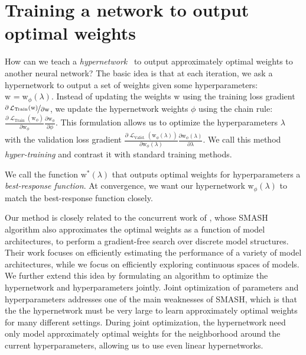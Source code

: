 \documentclass{article} %
\newcommand{\param}{\mathrm{w}} %
\newcommand{\hyper}{\lambda} %
\newcommand{\hyperFixed}{\hyper} %
\newcommand{\innerOptParam}[1]{\param^{*} \! \left( #1 \right)} %
\newcommand{\lossSymbol}{\mathop{\mathcal{L}}} %
\newcommand{\lossSymbolInner}{\lossSymbol_{\mathrm{Train}}} %
\newcommand{\lossSymbolOuter}{\lossSymbol_{\mathrm{Valid.}}} %
\newcommand{\responseParam}{\phi} %
\newcommand{\responseParamFixed}{\responseParam} %
\newcommand{\approxResponseSymbol}[1]{\param_{#1}} %
\newcommand{\approxResponse}[2]{\approxResponseSymbol{#2} ( #1 )} %
\begin{document}
\section{Training a network to output optimal weights}
\label{sec.new_formulation}
How can we teach a \emph{hypernetwork}~\citep{ha2016hypernetworks} to output approximately optimal weights to another neural network?
The basic idea is that at each iteration, we ask a hypernetwork to output a set of weights given some hyperparameters:
$\approxResponseSymbol{} = \approxResponse{\hyperFixed}{\responseParamFixed}$.
Instead of updating the weights $\param$ using the training loss gradient $\nicefrac{\partial \lossSymbolInner (\param)}{\partial \param}$, we update the hypernetwork weights $\responseParamFixed$ using the chain rule: $\frac{\partial \lossSymbolInner(\param_\responseParamFixed)}{\partial \param_\responseParamFixed} \frac{\partial \param_\responseParamFixed}{\partial \responseParamFixed}$.
This formulation allows us to optimize the hyperparameters $\hyper$ with the validation loss gradient $\frac{\partial \lossSymbolOuter(\param_\responseParamFixed (\hyper ))}{\partial \param_\responseParamFixed (\hyper )} \frac{\partial \param_\responseParamFixed (\hyper )}{\partial \hyper}$.
We call this method \emph{hyper-training} and contrast it with standard training methods.
%

We call the function $\innerOptParam{\hyper}$ that outputs optimal weights for hyperparameters a \emph{best-response function}.
At convergence, we want our hypernetwork $\approxResponse{\hyperFixed}{\responseParamFixed}$ to match the best-response function closely.

Our method is closely related to the concurrent work of \citet{brock2017smash}, whose SMASH algorithm also approximates the optimal weights as a function of model architectures, to perform a gradient-free search over discrete model structures.
Their work focuses on efficiently estimating the performance of a variety of model architectures, while we focus on efficiently exploring continuous spaces of models.
We further extend this idea by formulating an algorithm to optimize the hypernetwork and hyperparameters jointly.
Joint optimization of parameters and hyperparameters addresses one of the main weaknesses of SMASH, which is that the the hypernetwork must be very large to learn approximately optimal weights for many different settings.
During joint optimization, the hypernetwork need only model approximately optimal weights for the neighborhood around the current hyperparameters, allowing us to use even linear hypernetworks.
\end{document}
